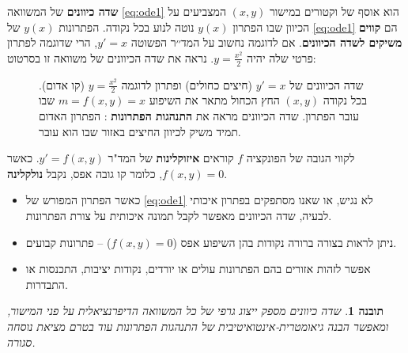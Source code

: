 \documentclass{article}
\numberwithin{equation}{section}
\newcounter{solution}[section]
\newtheorem{insight}{תובנה}[section]
\begin{document}
\textbf{שדה כיוונים} של המשוואה \eqref{eq:ode1} הוא אוסף של וקטורים במישור $(x,y)$
המצביעים על הכיוון שבו הפתרון $y(x)$ נוטה לנוע בכל נקודה.
הפתרונות $y(x)$ של \eqref{eq:ode1} הם \textbf{קווים משיקים לשדה הכיוונים}. אם לדוגמה נחשוב על המד׳׳ר הפשוטה $y'=x$, הרי שדוגמה לפתרון פרטי שלה יהיה $y=\frac{x^{2}}{2}$. נראה את שדה הכיוונים של משוואה זו בסרטוט:

\begin{figure}[H]
    \centering
    \caption{שדה הכיוונים של $y'=x$ (חיצים כחולים) ופתרון לדוגמה $y=\tfrac{x^2}{2}$ (קו אדום). 
    בכל נקודה $(x,y)$ החץ הכחול מתאר את השיפוע $m=f(x,y)=x$ שבו עובר הפתרון. 
    שדה הכיוונים מראה את \textbf{התנהגות הפתרונות }: הפתרון האדום תמיד משיק לכיוון החיצים באזור שבו הוא עובר.}
\end{figure}
 לקווי הגובה של הפונקציה $f$ קוראים \textbf{איזוקלינות} של המד"ר $y'=f(x,y)$. כאשר $f(x,y)=0$, כלומר קו גובה אפס, נקבל \textbf{נולקלינה}.

\begin{itemize}
  \item כאשר הפתרון המפורש של \eqref{eq:ode1} לא נגיש, או שאנו מסתפקים בפתרון איכותי לבעיה, שדה הכיוונים מאפשר לקבל תמונה איכותית על צורת הפתרונות.
  \item ניתן לראות בצורה ברורה נקודות בהן השיפוע אפס ($f(x,y)=0$) – פתרונות קבועים.
  \item אפשר לזהות אזורים בהם הפתרונות עולים או יורדים, נקודות יציבות, התכנסות או התבדרות.
\end{itemize}

\begin{insight}
שדה כיוונים מספק ייצוג גרפי של כל המשוואה הדיפרנציאלית על פני המישור, ומאפשר הבנה גיאומטרית-אינטואיטיבית של התנהגות הפתרונות עוד בטרם מציאת נוסחה סגורה.
\end{insight}
\end{document}
